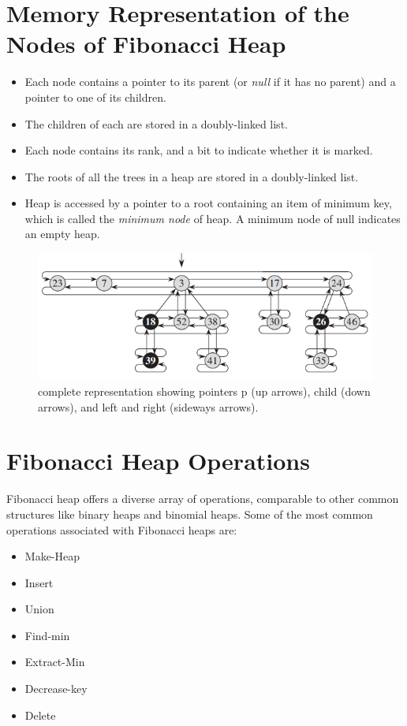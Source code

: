 \documentclass[12pt, a4paper]{article}
\begin{document}
	\pagebreak
	\section{Memory Representation of the Nodes of Fibonacci Heap}
	\begin{itemize}
		\item Each node contains a pointer to its parent (or \textit{null} if it has no parent) and a pointer to one of its children.
		\item The children of each are stored in a doubly-linked list.
		\item Each node contains its rank, and a bit to indicate whether it is marked.
		\item The roots of all the trees in a heap are stored in a doubly-linked list.
		\item Heap is accessed by a pointer to a root containing an item of minimum key, which is called the \textit{minimum node} of heap. A minimum node of null indicates an empty heap.
	\end{itemize}
	
	\begin{figure}[!h]
		\centering
		\includegraphics[]{pointers.png}
		\caption{complete representation showing pointers p (up arrows), child (down arrows), and left and right
			(sideways arrows)\cite{cormen2022introduction}.}
	\end{figure}
	
	
	\section{Fibonacci Heap Operations}
	Fibonacci heap offers a diverse array of operations, comparable to other common structures like binary heaps and binomial heaps. Some of the most common operations associated with Fibonacci heaps are:
	
	\begin{itemize}
		\item Make-Heap
		\item Insert
		\item Union
		\item Find-min
		\item Extract-Min
		\item Decrease-key
		\item Delete
	\end{itemize}
	
\end{document}

